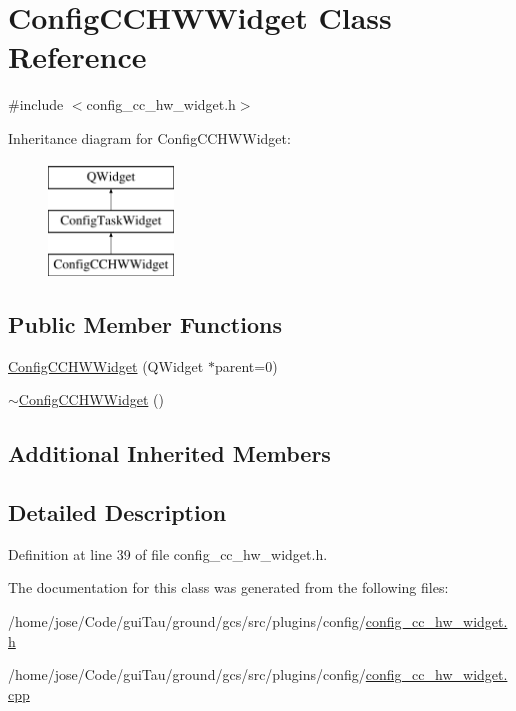\hypertarget{class_config_c_c_h_w_widget}{\section{Config\-C\-C\-H\-W\-Widget Class Reference}
\label{class_config_c_c_h_w_widget}
}


{\ttfamily \#include $<$config\-\_\-cc\-\_\-hw\-\_\-widget.\-h$>$}

Inheritance diagram for Config\-C\-C\-H\-W\-Widget\-:\begin{figure}[H]
\begin{center}
\leavevmode
\includegraphics[height=3.000000cm]{class_config_c_c_h_w_widget}
\end{center}
\end{figure}
\subsection*{Public Member Functions}
\begin{DoxyCompactItemize}
\item 
\hyperlink{group___config_plugin_ga7310551f62aff69c196b77b2680efb6b}{Config\-C\-C\-H\-W\-Widget} (Q\-Widget $\ast$parent=0)
\item 
\hyperlink{group___config_plugin_gaf57cdaf6ac0ff3096be01bbe4e6eea2b}{$\sim$\-Config\-C\-C\-H\-W\-Widget} ()
\end{DoxyCompactItemize}
\subsection*{Additional Inherited Members}


\subsection{Detailed Description}


Definition at line 39 of file config\-\_\-cc\-\_\-hw\-\_\-widget.\-h.



The documentation for this class was generated from the following files\-:\begin{DoxyCompactItemize}
\item 
/home/jose/\-Code/gui\-Tau/ground/gcs/src/plugins/config/\hyperlink{config__cc__hw__widget_8h}{config\-\_\-cc\-\_\-hw\-\_\-widget.\-h}\item 
/home/jose/\-Code/gui\-Tau/ground/gcs/src/plugins/config/\hyperlink{config__cc__hw__widget_8cpp}{config\-\_\-cc\-\_\-hw\-\_\-widget.\-cpp}\end{DoxyCompactItemize}
